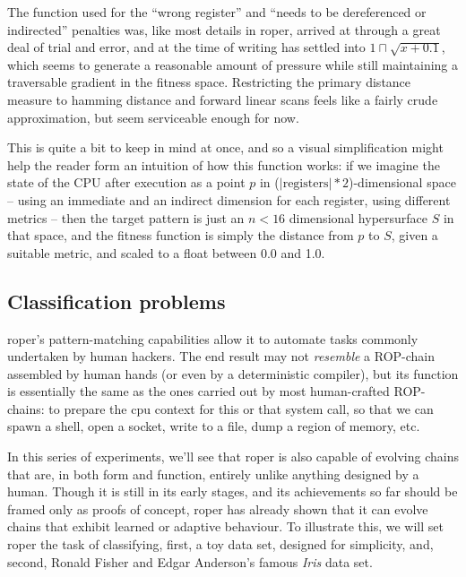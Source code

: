 \documentclass[12pt,glossary]{dalthesis}
\begin{document}
The function used for the ``wrong register'' and ``needs to be dereferenced or indirected''
penalties was, like most details in \gls{roper}, arrived at through a great deal of
trial and error, and at the time of writing has settled into \(1 \sqcap \sqrt{x+0.1}\),
which seems to generate a reasonable amount of pressure while still maintaining
a traversable gradient in the fitness space. Restricting the primary distance measure
to hamming distance and forward linear scans feels like a fairly crude approximation,
but seem serviceable enough for now.

This is quite a bit to keep in mind at once, and so a visual simplification
might help the reader form an intuition of how this function works: if we
imagine the state of the CPU after execution as a point \(p\) in
(\(|\text{registers}|*2\))-dimensional space -- using an immediate and an indirect
dimension for each register, using different metrics -- then the target pattern
is just an \(n<16\) dimensional hypersurface \(S\) in that space, and the fitness
function is simply the distance from \(p\) to \(S\), given a suitable metric, and
scaled to a float between 0.0 and 1.0.

\subsection{Classification problems}
\label{sec:org599ee37}
\label{orgb60b8bc}

\Gls{roper}'s pattern-matching capabilities allow it to automate tasks commonly
undertaken by human hackers. The end result may not \emph{resemble} a ROP-chain
assembled by human hands (or even by a deterministic compiler), but its function
is essentially the same as the ones carried out by most human-crafted
ROP-chains: to prepare the \gls{cpu} context for this or that system call, so that
we can spawn a shell, open a socket, write to a file, dump a region of memory,
etc.

In this series of experiments, we'll see that \gls{roper} is also capable of
evolving chains that are, in both form and function, entirely unlike anything
designed by a human. Though it is still in its early stages, and its
achievements so far should be framed only as proofs of concept, \gls{roper} has
already shown that it can evolve chains that exhibit learned or adaptive
behaviour. To illustrate this, we will set \gls{roper} the task of classifying, first,
a toy data set, designed for simplicity, and, second, Ronald Fisher and Edgar
Anderson's famous \emph{Iris} data set.
\end{document}
